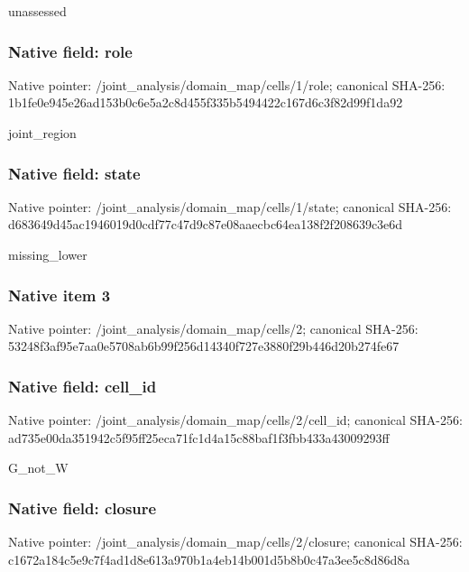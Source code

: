 \documentclass[10pt,a4paper]{article}
\begin{document}
\begingroup\raggedright\sloppy unassessed\par\endgroup

\subsubsection{Native field: role}
Native pointer: /joint\_\allowbreak{}analysis/domain\_\allowbreak{}map/cells/1/role; canonical SHA-256: 1b1fe0e945e26ad153b0c6e5a2c8d455f335b5494422c167d6c3f82d99f1da92

\begingroup\raggedright\sloppy joint\_\allowbreak{}region\par\endgroup

\subsubsection{Native field: state}
Native pointer: /joint\_\allowbreak{}analysis/domain\_\allowbreak{}map/cells/1/state; canonical SHA-256: d683649d45ac1946019d0cdf77c47d9c87e08aaecbc64ea138f2f208639c3e6d

\begingroup\raggedright\sloppy missing\_\allowbreak{}lower\par\endgroup

\subsubsection{Native item 3}
Native pointer: /joint\_\allowbreak{}analysis/domain\_\allowbreak{}map/cells/2; canonical SHA-256: 53248f3af95e7aa0e5708ab6b99f256d14340f727e3880f29b446d20b274fe67

\subsubsection{Native field: cell\_\allowbreak{}id}
Native pointer: /joint\_\allowbreak{}analysis/domain\_\allowbreak{}map/cells/2/cell\_\allowbreak{}id; canonical SHA-256: ad735e00da351942c5f95ff25eca71fc1d4a15c88baf1f3fbb433a43009293ff

\begingroup\raggedright\sloppy G\_\allowbreak{}not\_\allowbreak{}W\par\endgroup

\subsubsection{Native field: closure}
Native pointer: /joint\_\allowbreak{}analysis/domain\_\allowbreak{}map/cells/2/closure; canonical SHA-256: c1672a184c5e9c7f4ad1d8e613a970b1a4eb14b001d5b8b0c47a3ee5c8d86d8a
\end{document}
